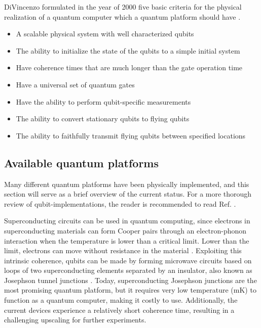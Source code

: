 DiVincenzo formulated in the year of 2000 five basic criteria for the physical realization of a quantum computer which a quantum platform should have \cite{DiVincenzo2000}.

\begin{itemize}
  \item A scalable physical system with well characterized qubits
  \item The ability to initialize the state of the qubits to a simple initial system
  \item Have coherence times that are much longer than the gate operation time
  \item Have a universal set of quantum gates
  \item Have the ability to perform qubit-specific measurements
\end{itemize}

\begin{itemize}
  \item The ability to convert stationary qubits to flying qubits
  \item The ability to faithfully transmit flying qubits between specified locations
\end{itemize}

\subsection{Available quantum platforms}


Many different quantum platforms have been physically implemented, and this section will serve as a brief overview of the current status. For a more thorough review of qubit-implementations, the reader is recommended to read Ref. \cite{Acin2018}.

Superconducting circuits can be used in quantum computing, since electrons in superconducting materials can form Cooper pairs through an electron-phonon interaction when the temperature is lower than a critical limit. Lower than the limit, electrons can move without resistance in the material \cite{KristianFossheim2004}. Exploiting this intrinsic coherence, qubits can be made by forming microwave circuits based on loops of two superconducting elements separated by an insulator, also known as Josephson tunnel junctions \cite{Acin2018}. Today, superconducting Josephson junctions are the most promising quantum platform, but it requires very low temperature (mK) to function as a quantum computer, making it costly to use. Additionally, the current devices experience a relatively short coherence time, resulting in a challenging upscaling for further experiments.

